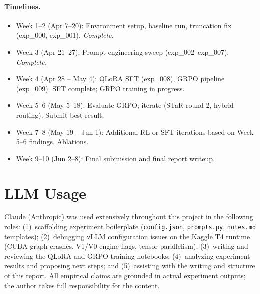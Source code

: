 \documentclass{article}
\begin{document}
\paragraph{Timelines.}
\begin{itemize}
  \item Week 1--2 (Apr 7--20): Environment setup, baseline run, truncation fix (exp\_000, exp\_001). \textit{Complete.}
  \item Week 3 (Apr 21--27): Prompt engineering sweep (exp\_002--exp\_007). \textit{Complete.}
  \item Week 4 (Apr 28 -- May 4): QLoRA SFT (exp\_008), GRPO pipeline (exp\_009). SFT complete; GRPO training in progress.
  \item Week 5--6 (May 5--18): Evaluate GRPO; iterate (STaR round 2, hybrid routing). Submit best result.
  \item Week 7--8 (May 19 -- Jun 1): Additional RL or SFT iterations based on Week 5--6 findings. Ablations.
  \item Week 9--10 (Jun 2--8): Final submission and final report writeup.
\end{itemize}


\section*{LLM Usage}
Claude (Anthropic) was used extensively throughout this project in the following roles: (1)~scaffolding experiment boilerplate (\texttt{config.json}, \texttt{prompts.py}, \texttt{notes.md} templates); (2)~debugging vLLM configuration issues on the Kaggle T4 runtime (CUDA graph crashes, V1/V0 engine flags, tensor parallelism); (3)~writing and reviewing the QLoRA and GRPO training notebooks; (4)~analyzing experiment results and proposing next steps; and (5)~assisting with the writing and structure of this report. All empirical claims are grounded in actual experiment outputs; the author takes full responsibility for the content.




\end{document}
